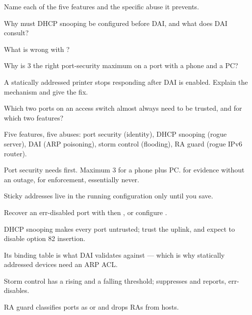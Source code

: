 \begin{checkpoint}
\begin{tightnum}
  \item Name each of the five features and the specific abuse it prevents.
  \item Why must DHCP snooping be configured before DAI, and what does DAI
        consult?
  \item What is wrong with ?
  \item Why is 3 the right port-security maximum on a port with a phone and a PC?
  \item A statically addressed printer stops responding after DAI is enabled.
        Explain the mechanism and give the fix.
  \item Which two ports on an access switch almost always need to be trusted, and
        for which two features?
\end{tightnum}
\end{checkpoint}

\begin{chaptersummary}
\begin{tight}
  \item Five features, five abuses: port security (identity), DHCP snooping
        (rogue server), DAI (ARP poisoning), storm control (flooding), RA guard
        (rogue IPv6 router).
  \item Port security needs  first. Maximum 3 for a
        phone plus PC.  for evidence without an outage,
         for enforcement,  essentially never.
  \item Sticky addresses live in the running configuration only until you save.
  \item Recover an err-disabled port with  then ,
        or configure .
  \item DHCP snooping makes every port untrusted; trust the uplink, and expect to
        disable option 82 insertion.
  \item Its binding table is what DAI validates against --- which is why
        statically addressed devices need an ARP ACL.
  \item Storm control has a rising and a falling threshold;  suppresses
        and reports,  err-disables.
  \item RA guard classifies ports as  or  and drops RAs
        from hosts.
\end{tight}
\end{chaptersummary}

